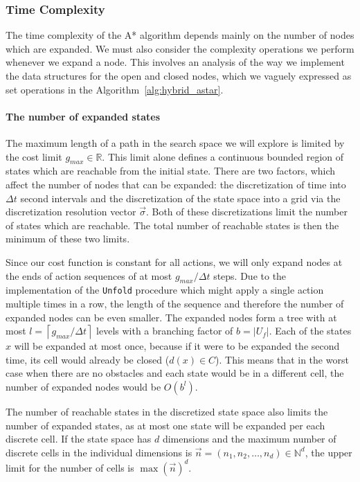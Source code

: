 \subsubsection{Time Complexity}

The time complexity of the A* algorithm depends mainly on the number of nodes which are expanded. We must also consider the complexity operations we perform whenever we expand a node. This involves an analysis of the way we implement the data structures for the open and closed nodes, which we vaguely expressed as set operations in the Algorithm~\ref{alg:hybrid_astar}.

\paragraph{The number of expanded states} The maximum length of a path in the search space we will explore is limited by the cost limit $g_{max}\in \mathbb{R}$. This limit alone defines a continuous bounded region of states which are reachable from the initial state. There are two factors, which affect the number of nodes that can be expanded: the discretization of time into $\Delta t$ second intervals and the discretization of the state space into a grid via the discretization resolution vector $\vec{\sigma}$. Both of these discretizations limit the number of states which are reachable. The total number of reachable states is then the minimum of these two limits.

Since our cost function is constant for all actions, we will only expand nodes at the ends of action sequences of at most $g_{max}/\Delta t$ steps. Due to the implementation of the \texttt{Unfold} procedure which might apply a single action multiple times in a row, the length of the sequence and therefore the number of expanded nodes can be even smaller. The expanded nodes form a tree with at most $l=\left\lceil g_{max}/\Delta t\right\rceil$ levels with a branching factor of $b=|U_f|$. Each of the states $x$ will be expanded at most once, because if it were to be expanded the second time, its cell would already be closed ($d(x)\in C$). This means that in the worst case when there are no obstacles and each state would be in a different cell, the number of expanded nodes would be $O(b^l)$.

The number of reachable states in the discretized state space also limits the number of expanded states, as at most one state will be expanded per each discrete cell. If the state space has $d$ dimensions and the maximum number of discrete cells in the individual dimensions is $\vec{n}=\left(n_1, n_2, \ldots, n_d\right)\in \mathbb{N}^d$, the upper limit for the number of cells is $\max(\vec{n})^d$.

